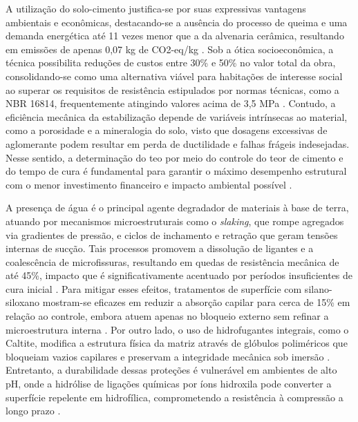 A utilização do solo-cimento justifica-se por suas expressivas vantagens ambientais e econômicas, destacando-se a ausência do processo de queima e uma demanda energética até 11 vezes menor que a da alvenaria cerâmica, resultando em emissões de apenas 0,07 kg de CO2-eq/kg \cite{Barroso2019, Brito2023, Ibrahim2020}. Sob a ótica socioeconômica, a técnica possibilita reduções de custos entre 30\% e 50\% no valor total da obra, consolidando-se como uma alternativa viável para habitações de interesse social ao superar os requisitos de resistência estipulados por normas técnicas, como a NBR 16814, frequentemente atingindo valores acima de 3,5 MPa \cite{Ibrahim2020, Kariyawasam2016, Junior2020, Dao2018, Bogas2019}. Contudo, a eficiência mecânica da estabilização depende de variáveis intrínsecas ao material, como a porosidade e a mineralogia do solo, visto que dosagens excessivas de aglomerante podem resultar em perda de ductilidade e falhas frágeis indesejadas. Nesse sentido, a determinação do \gls{teo} por meio do controle do teor de cimento e do tempo de cura é fundamental para garantir o máximo desempenho estrutural com o menor investimento financeiro e impacto ambiental possível \cite{Santana2021}.


A presença de água é o principal agente degradador de materiais à base de terra, atuando por mecanismos microestruturais como o \textit{slaking}, que rompe agregados via gradientes de pressão, e ciclos de inchamento e retração que geram tensões internas de sucção. Tais processos promovem a dissolução de ligantes e a coalescência de microfissuras, resultando em quedas de resistência mecânica de até 45\%, impacto que é significativamente acentuado por períodos insuficientes de cura inicial \cite{Hu2018, Liu2023, Ralf2025}. Para mitigar esses efeitos, tratamentos de superfície com silano-siloxano mostram-se eficazes em reduzir a absorção capilar para cerca de 15\% em relação ao controle, embora atuem apenas no bloqueio externo sem refinar a microestrutura interna \cite{Bogas2020}. Por outro lado, o uso de hidrofugantes integrais, como o Caltite, modifica a estrutura física da matriz através de glóbulos poliméricos que bloqueiam vazios capilares e preservam a integridade mecânica sob imersão \cite{Ezreig2022}. Entretanto, a durabilidade dessas proteções é vulnerável em ambientes de alto pH, onde a hidrólise de ligações químicas por íons hidroxila pode converter a superfície repelente em hidrofílica, comprometendo a resistência à compressão a longo prazo \cite{Guo2025}.

